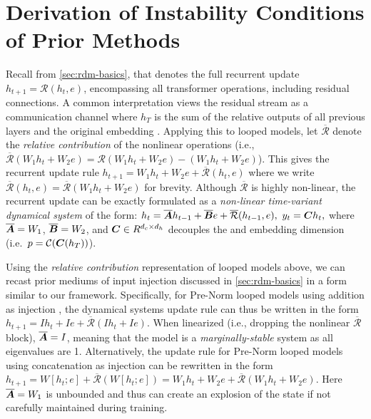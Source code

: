 \section{Derivation of Instability Conditions of Prior Methods}
\label{sec:derivation-instabilty}


Recall from \cref{sec:rdm-basics}, that \recurrent denotes the full recurrent update $h_{t+1} = \mathcal{R}(h_t,e)$, encompassing all transformer operations, including residual connections. 
A common interpretation views the residual stream as a communication channel where $h_T$ is the sum of the relative outputs of all previous layers and the original embedding \cite{olsson2022incontextlearninginductionheads}. 
Applying this to looped models, let $\overline{\mathcal{R}}$ denote the \emph{relative contribution} of the nonlinear operations (i.e., $\overline{\mathcal{R}}(W_1 h_t + W_2 e) = \mathcal{R}(W_1 h_t + W_2 e) - (W_1 h_t + W_2 e)$). 
This gives the recurrent update rule
$h_{t+1} = W_1 h_t + W_2 e + \overline{\mathcal{R}}(h_t, e)$
where we write $\overline{\mathcal{R}}(h_t, e) = \overline{\mathcal{R}}(W_1 h_t + W_2 e)$ for brevity. 
Although $\overline{\mathcal{R}}$ is highly non-linear, the recurrent update can be exactly formulated as a \emph{non-linear time-variant dynamical system} of the form:
$h_{t} = \overline{\bm{A}} h_{t-1} + \overline{\bm{B}} e + \overline{\mathcal{R}}(h_{t-1}, e), ~ y_t = \bm{C} h_t,$
where $\overline{\bm{A}} = W_1$, $\overline{\bm{B}} = W_2$, and $\bm{C} \in R^{d_c \times d_h}$ decouples the \coda and \recurrent embedding dimension (i.e.~$p=\mathcal{C}(\bm{C}(h_T))$).


Using the \emph{relative contribution} representation of looped models above, we can recast
prior mediums of input injection discussed in \cref{sec:rdm-basics} in a form similar to our framework.
Specifically, for Pre-Norm looped models using addition as injection \cite{yangLoopedTransformersAre2023}, the dynamical systems update rule can thus be written in the form $h_{t+1} = Ih_t + Ie + \overline{\mathcal{R}}(Ih_t + Ie)$.
When linearized (i.e., dropping the nonlinear $\overline{\mathcal{R}}$ block), $\overline{\bm{A}} = I$, meaning that the model is a \emph{marginally-stable} system as all eigenvalues are 1. Alternatively, the update rule for Pre-Norm looped models using concatenation as injection \cite{geiping_scaling_2025} can be rewritten in the form $h_{t+1} = W[h_t;e] + \overline{\mathcal{R}}(W[h_t;e]) = W_1 h_t + W_2 e + \overline{\mathcal{R}}(W_1 h_t + W_2e)$. Here $\overline{\bm{A}} = W_1$ is unbounded and thus can create an explosion of the state if not carefully maintained during training.
